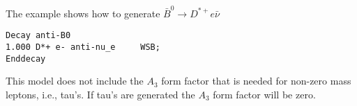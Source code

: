 \Example
The example shows how to generate $\bar B^0\rightarrow D^{*+}e\bar\nu$
\begin{verbatim}
Decay anti-B0
1.000 D*+ e- anti-nu_e     WSB;
Enddecay
\end{verbatim}

\Notes
This model does not include the $A_3$ form factor that is 
needed for non-zero mass leptons, i.e., tau's. If tau's
are generated the $A_3$ form factor will be zero.




















